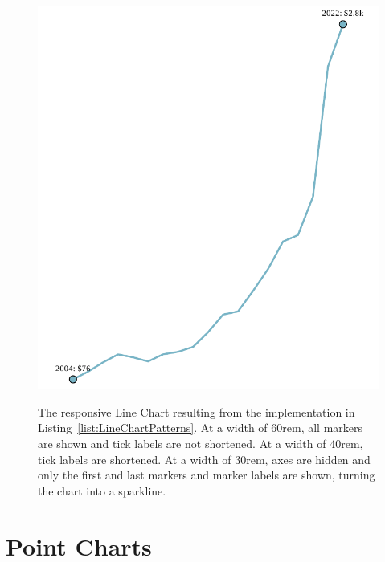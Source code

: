 \begin{figure}[tp]
{  \includegraphics[valign=b,scale=\respscale]{diagrams/respvis-line-30rem.pdf}%
  \label{fig:LineChartPatterns30rem}%
}
\caption[Responsive RespVis Line Chart]{%
The responsive Line Chart resulting from the implementation in
Listing~\ref{list:LineChartPatterns}.
 At a width of 60rem, all
markers are shown and tick labels are not shortened.
 At a width of 40rem, tick
labels are shortened.  At a
width of 30rem, axes are hidden and only the first and last
markers and marker labels are shown, turning the chart into a
sparkline.
}
\label{fig:LineChartPatterns}
\end{figure}









\section{Point Charts}
\label{sec:PointChartsUsage}

